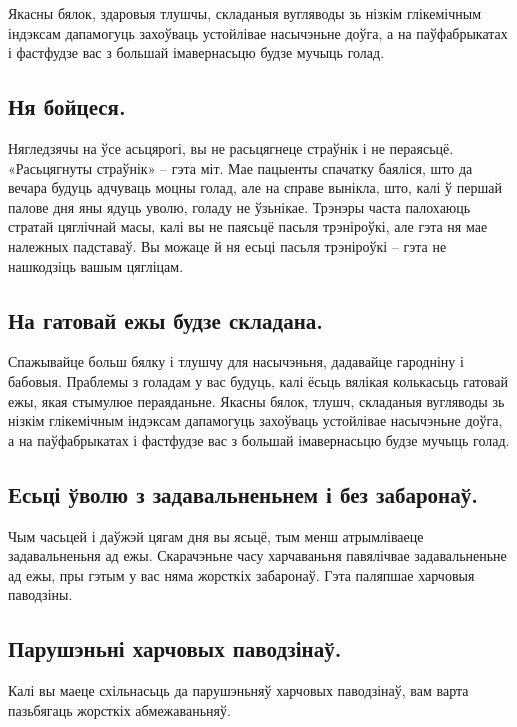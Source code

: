 Якасны бялок, здаровыя тлушчы, складаныя вугляводы зь нізкім глікемічным індэксам дапамогуць захоўваць устойлівае насычэньне доўга, а на паўфабрыкатах і фастфудзе вас з большай імавернасьцю будзе мучыць голад.

\subsection{Ня бойцеся.}
Нягледзячы на ўсе асьцярогі, вы не расьцягнеце страўнік і не пераясьцё. «Расьцягнуты страўнік» – гэта міт. Мае пацыенты спачатку баяліся, што да вечара будуць адчуваць моцны голад, але на справе вынікла, што, калі ў першай палове дня яны ядуць уволю, голаду не ўзьнікае. Трэнэры часта палохаюць стратай цяглічнай масы, калі вы не паясьцё пасьля трэніроўкі, але гэта ня мае належных падставаў. Вы можаце й ня есьці пасьля трэніроўкі – гэта не нашкодзіць вашым цягліцам.

\subsection{На гатовай ежы будзе складана.}
Спажывайце больш бялку і тлушчу для насычэньня, дадавайце гародніну і бабовыя. Праблемы з голадам у вас будуць, калі ёсьць вялікая колькасьць гатовай ежы, якая стымулюе пераяданьне. Якасны бялок, тлушч, складаныя вугляводы зь нізкім глікемічным індэксам дапамогуць захоўваць устойлівае насычэньне доўга, а на паўфабрыкатах і фастфудзе вас з большай імавернасьцю будзе мучыць голад.

\subsection{Есьці ўволю з задавальненьнем і без забаронаў.}
Чым часьцей і даўжэй цягам дня вы ясьцё, тым менш атрымліваеце задавальненьня ад ежы. Скарачэньне часу харчаваньня павялічвае задавальненьне ад ежы, пры гэтым у вас няма жорсткіх забаронаў. Гэта паляпшае харчовыя паводзіны.

\subsection{Парушэньні харчовых паводзінаў.}
Калі вы маеце схільнасьць да парушэньняў харчовых паводзінаў, вам варта пазьбягаць жорсткіх абмежаваньняў.
